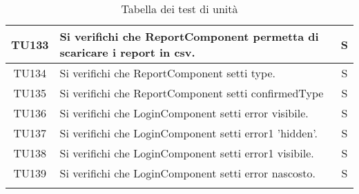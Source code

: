 \begin{center}
\begin{longtable}{|c|p{10cm}|c|}
			\hline
			TU133 & Si verifichi che ReportComponent permetta di scaricare i report in csv.  & S \\
			\hline
			TU134 & Si verifichi che ReportComponent setti type.  & S \\
			\hline
			TU135 & Si verifichi che ReportComponent setti confirmedType  & S \\
			\hline
			TU136 & Si verifichi che LoginComponent setti error visibile.  & S \\
			\hline
			TU137 & Si verifichi che LoginComponent setti error1 'hidden'. & S \\
			\hline
			TU138 & Si verifichi che LoginComponent setti error1 visibile.  & S \\
			\hline
			TU139 & Si verifichi che LoginComponent setti error nascosto. & S \\
			\hline
			
			\hiderowcolors
			\caption{Tabella dei test di unità}		
		\end{longtable}	
	\end{center}

